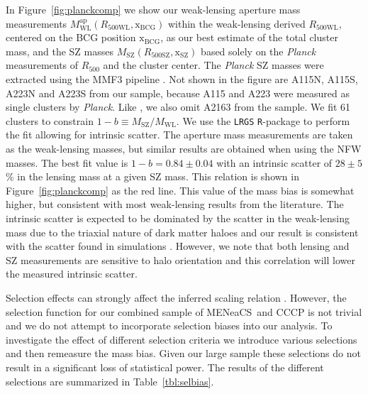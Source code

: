 \documentclass[useAMS,usenatbib]{mnras}
\newcommand{\mn}{MENeaCS}
\begin{document}
In Figure~\ref{fig:planckcomp} we show our weak-lensing aperture mass measurements $M^\mathrm{ap}_\mathrm{WL} (R_\mathrm{500WL}, \mathrm{x_{BCG}})$ within the weak-lensing derived $R_\mathrm{500WL}$, centered on the BCG position $\mathrm{x_{BCG}}$, as our best estimate of the total cluster mass, and the SZ masses $M_\mathrm{SZ} (R_\mathrm{500SZ},  \mathrm{x_{SZ}})$ based solely on the \textit{Planck} measurements of $R_{500}$ and the cluster center. The \textit{Planck} SZ masses were extracted using the MMF3 pipeline \citep{planckSZclusters16}. 
Not shown in the figure are A115N, A115S, A223N and A223S from our sample, because A115 and A223 were measured as single clusters by \textit{Planck}. Like , we also omit A2163 from the sample. We fit 61 clusters to constrain $1-b \equiv M_\mathrm{SZ} / M_\mathrm{WL}$. We use the {\tt LRGS} {\tt R}-package \citep{mantz16b} to perform the fit allowing for intrinsic scatter. The aperture mass measurements are taken as the weak-lensing masses, but similar results are obtained when using the NFW masses. 
The best fit value is $1-b = 0.84 \pm 0.04$ with an intrinsic scatter of $28 \pm 5$\% in the lensing mass at a given SZ mass. This relation is shown in Figure~\ref{fig:planckcomp} as the red line. This value of the mass bias is somewhat higher, but consistent with most weak-lensing results from the literature. The intrinsic scatter is expected to be dominated by the scatter in the weak-lensing mass due to the triaxial nature of dark matter haloes \citep[e.g.][]{herbonnet19} and our result is consistent with the scatter found in simulations \citep[e.g.][]{meneghetti10, henson17}. However, we note that both lensing and SZ measurements are sensitive to halo orientation and this correlation will lower the measured intrinsic scatter.

 
 
Selection effects can strongly affect the inferred scaling relation \citep[e.g.][]{mantz19}.
However, the selection function for our combined sample of \mn \ and CCCP is not trivial and we do not attempt to incorporate selection biases into our analysis. To investigate the effect of different selection criteria we introduce various selections and then remeasure the mass bias. Given our large sample these selections do not result in a significant loss of statistical power. The results of the different selections are summarized in Table~\ref{tbl:selbias}.
\end{document}
